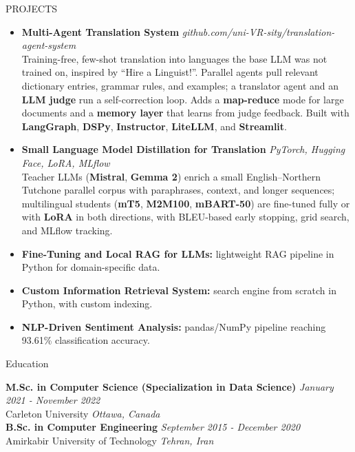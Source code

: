 \documentclass{resume}
\begin{document}
\begin{rSection}{PROJECTS}
\begin{itemize}

\item \textbf{Multi-Agent Translation System} \hfill \textit{github.com/uni-VR-sity/translation-agent-system}\\
{Training-free, few-shot translation into languages the base LLM was not trained on, inspired by ``Hire a Linguist!''. Parallel agents pull relevant dictionary entries, grammar rules, and examples; a translator agent and an \textbf{LLM judge} run a self-correction loop. Adds a \textbf{map-reduce} mode for large documents and a \textbf{memory layer} that learns from judge feedback. Built with \textbf{LangGraph}, \textbf{DSPy}, \textbf{Instructor}, \textbf{LiteLLM}, and \textbf{Streamlit}.}

\item \textbf{Small Language Model Distillation for Translation} \hfill \textit{PyTorch, Hugging Face, LoRA, MLflow}\\
{Teacher LLMs (\textbf{Mistral}, \textbf{Gemma 2}) enrich a small English--Northern Tutchone parallel corpus with paraphrases, context, and longer sequences; multilingual students (\textbf{mT5}, \textbf{M2M100}, \textbf{mBART-50}) are fine-tuned fully or with \textbf{LoRA} in both directions, with BLEU-based early stopping, grid search, and MLflow tracking.}

\item \textbf{Fine-Tuning and Local RAG for LLMs:} lightweight RAG pipeline in Python for domain-specific data.

\item \textbf{Custom Information Retrieval System:} search engine from scratch in Python, with custom indexing.

\item \textbf{NLP-Driven Sentiment Analysis:} pandas/NumPy pipeline reaching 93.61\% classification accuracy.

\end{itemize}
\end{rSection}

\begin{rSection}{Education}

{\bf M.Sc. in Computer Science (Specialization in Data Science)}  \hfill {\textit{January 2021 - November 2022}}\\
{Carleton University} \hfill \textit{Ottawa, Canada}\\[0.5em]
{\bf B.Sc. in Computer Engineering} \hfill {\textit{September 2015 - December 2020}}\\
Amirkabir University of Technology \hfill \textit{Tehran, Iran}

\end{rSection}
\end{document}
